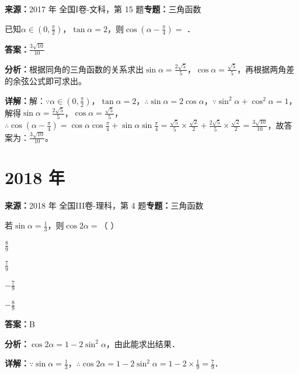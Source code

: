 \begin{question}[points=5]
\textbf{来源：}2017 年 全国I卷-文科，第 15 题\quad \textbf{专题：}三角函数\par
已知$\alpha\in(0,\frac{\pi}{2})$，$\tan\alpha=2$，则$\cos(\alpha-\frac{\pi}{4})=$ ．
\begin{solution}
\textbf{答案：}$\frac{3\sqrt{10}}{10}$

\textbf{分析：}根据同角的三角函数的关系求出$\sin\alpha=\frac{2\sqrt{5}}{5}$，$\cos\alpha=\frac{\sqrt{5}}{5}$，再根据两角差的余弦公式即可求出。

\textbf{详解：}解：$\because\alpha\in(0,\frac{\pi}{2})$，$\tan\alpha=2$，$\therefore\sin\alpha=2\cos\alpha$，$\because\sin^2\alpha+\cos^2\alpha=1$，解得$\sin\alpha=\frac{2\sqrt{5}}{5}$，$\cos\alpha=\frac{\sqrt{5}}{5}$，$\therefore\cos(\alpha-\frac{\pi}{4})=\cos\alpha\cos\frac{\pi}{4}+\sin\alpha\sin\frac{\pi}{4}=\frac{\sqrt{5}}{5}\times\frac{\sqrt{2}}{2}+\frac{2\sqrt{5}}{5}\times\frac{\sqrt{2}}{2}=\frac{3\sqrt{10}}{10}$，故答案为：$\frac{3\sqrt{10}}{10}$。
\end{solution}
\end{question}

\section*{2018 年}

\begin{question}[points=5]
\textbf{来源：}2018 年 全国III卷-理科，第 4 题\quad \textbf{专题：}三角函数\par
若$\sin\alpha=\frac{1}{3}$，则$\cos2\alpha=$（ ）
\begin{choices}
  \item $\frac{8}{9}$
  \item $\frac{7}{9}$
  \item $-\frac{7}{9}$
  \item $-\frac{8}{9}$
\end{choices}
\begin{solution}
\textbf{答案：}B

\textbf{分析：}$\cos2\alpha=1-2\sin^2\alpha$，由此能求出结果．

\textbf{详解：}$\because \sin\alpha=\frac{1}{3}$，$\therefore \cos2\alpha=1-2\sin^2\alpha=1-2\times\frac{1}{9}=\frac{7}{9}$．
\end{solution}
\end{question}

